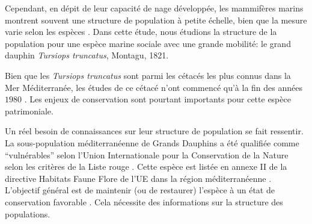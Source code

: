 \documentclass[a4paper,12pt,twoside]{article}\usepackage[]{graphicx}\usepackage[]{color}
\begin{document}
\begin {bibunit} [newbst]
Cependant, en dépit de leur capacité de nage développée, les mammifères marins montrent souvent une structure de population à petite échelle, bien que la mesure varie selon les espèces \citep{hoelzel2002low}. Dans cette étude, nous étudions la structure de la population pour une espèce marine sociale avec une grande mobilité: le grand dauphin \emph{Tursiops truncatus}, Montagu, 1821.

Bien que les \emph{Tursiops truncatus} sont parmi les cétacés les plus connus dans la Mer Méditerranée, les études de ce cétacé n'ont commencé qu'à la fin des années $1980$ \citep{bearzi2009ecology}. Les enjeux de conservation sont pourtant importants pour cette espèce patrimoniale. 

Un réel besoin de connaissances sur leur structure de population se fait ressentir. La sous-population méditerranéenne de Grands Dauphins a été qualifiée comme ``vulnérables'' selon l'Union Internationale pour la Conservation de la Nature selon les critères de la Liste rouge \citep{bearzi2006common}. Cette espèce est listée en annexe II de la directive Habitats Faune Flore de l'UE dans la région méditerranéenne \citep{Laran2016}. L'objectif général est de maintenir (ou de restaurer) l'espèce à un état de conservation favorable \citep{evans2004monitoring}. Cela nécessite des informations sur la structure des populations.


\end{bibunit}
\end{document}
